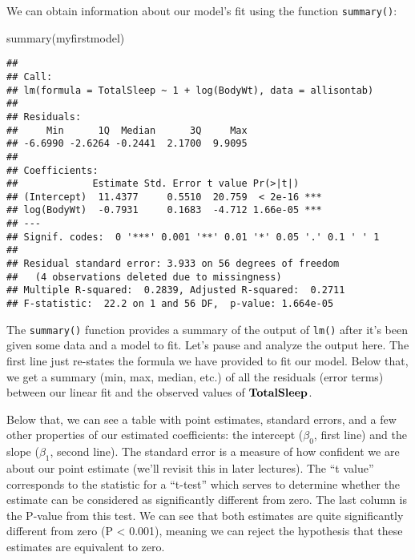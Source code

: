 \documentclass[
]{book}
\newenvironment{Shaded}{\begin{snugshade}}{\end{snugshade}}
\newcommand{\FunctionTok}[1]{\textcolor[rgb]{0.00,0.00,0.00}{#1}}
\newcommand{\NormalTok}[1]{#1}
\begin{document}
We can obtain information about our model's fit using the function \texttt{summary()}:

\begin{Shaded}
\begin{Highlighting}[]
\FunctionTok{summary}\NormalTok{(myfirstmodel)}
\end{Highlighting}
\end{Shaded}

\begin{verbatim}
## 
## Call:
## lm(formula = TotalSleep ~ 1 + log(BodyWt), data = allisontab)
## 
## Residuals:
##     Min      1Q  Median      3Q     Max 
## -6.6990 -2.6264 -0.2441  2.1700  9.9095 
## 
## Coefficients:
##             Estimate Std. Error t value Pr(>|t|)    
## (Intercept)  11.4377     0.5510  20.759  < 2e-16 ***
## log(BodyWt)  -0.7931     0.1683  -4.712 1.66e-05 ***
## ---
## Signif. codes:  0 '***' 0.001 '**' 0.01 '*' 0.05 '.' 0.1 ' ' 1
## 
## Residual standard error: 3.933 on 56 degrees of freedom
##   (4 observations deleted due to missingness)
## Multiple R-squared:  0.2839, Adjusted R-squared:  0.2711 
## F-statistic:  22.2 on 1 and 56 DF,  p-value: 1.664e-05
\end{verbatim}

The \texttt{summary()} function provides a summary of the output of \texttt{lm()} after it's been given some data and a model to fit. Let's pause and analyze the output here. The first line just re-states the formula we have provided to fit our model. Below that, we get a summary (min, max, median, etc.) of all the residuals (error terms) between our linear fit and the observed values of \(\bf{TotalSleep}\).

Below that, we can see a table with point estimates, standard errors, and a few other properties of our estimated coefficients: the intercept (\(\beta_0\), first line) and the slope (\(\beta_1\), second line). The standard error is a measure of how confident we are about our point estimate (we'll revisit this in later lectures). The ``t value'' corresponds to the statistic for a ``t-test'' which serves to determine whether the estimate can be considered as significantly different from zero. The last column is the P-value from this test. We can see that both estimates are quite significantly different from zero (P \textless{} 0.001), meaning we can reject the hypothesis that these estimates are equivalent to zero.
\end{document}
